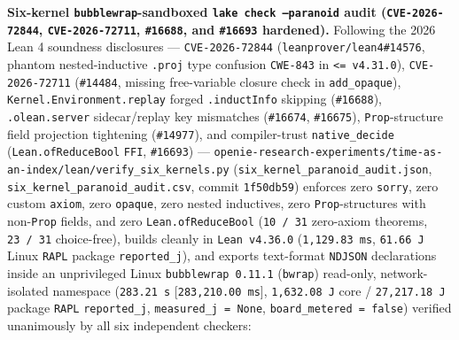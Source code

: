 \documentclass[10pt,letterpaper]{article}
\begin{document}
\textbf{Six-kernel \texttt{bubblewrap}-sandboxed
\texttt{lake\ check\ --paranoid} audit (\texttt{CVE-2026-72844},
\texttt{CVE-2026-72711}, \texttt{\#16688}, and \texttt{\#16693}
hardened).} Following the 2026 Lean 4 soundness disclosures ---
\texttt{CVE-2026-72844} (\texttt{leanprover/\allowbreak{}lean4\#14576}, phantom
nested-inductive \texttt{.proj} type confusion \texttt{CWE-843} in
\texttt{<=\ v4.31.0}), \texttt{CVE-2026-72711} (\texttt{\#14484},
missing free-variable closure check in \texttt{add\_opaque}),
\texttt{Kernel.\allowbreak{}Environment.\allowbreak{}replay} forged \texttt{.inductInfo} skipping
(\texttt{\#16688}), \texttt{.olean.server} sidecar/replay key mismatches
(\texttt{\#16674}, \texttt{\#16675}), \texttt{Prop}-structure field
projection tightening (\texttt{\#14977}), and compiler-trust
\texttt{native\_decide} (\texttt{Lean.\allowbreak{}ofReduceBool} \texttt{FFI},
\texttt{\#16693}) ---
\texttt{openie-\allowbreak{}research-\allowbreak{}experiments/\allowbreak{}time-\allowbreak{}as-\allowbreak{}an-\allowbreak{}index/\allowbreak{}lean/\allowbreak{}verify\_\allowbreak{}six\_\allowbreak{}kernels.\allowbreak{}py}
(\texttt{six\_\allowbreak{}kernel\_\allowbreak{}paranoid\_\allowbreak{}audit.\allowbreak{}json},
\texttt{six\_\allowbreak{}kernel\_\allowbreak{}paranoid\_\allowbreak{}audit.\allowbreak{}csv}, commit
\texttt{1f50db59}) enforces zero \texttt{sorry}, zero custom
\texttt{axiom}, zero \texttt{opaque}, zero nested inductives, zero
\texttt{Prop}-structures with non-\texttt{Prop} fields, and zero
\texttt{Lean.\allowbreak{}ofReduceBool} (\texttt{10\ /\ 31} zero-axiom theorems,
\texttt{23\ /\ 31} choice-free), builds cleanly in
\texttt{Lean\ v4.36.0} (\texttt{1,129.83\ ms}, \texttt{61.66\ J} Linux
\texttt{RAPL} package \texttt{reported\_j}), and exports text-format
\texttt{NDJSON} declarations inside an unprivileged Linux
\texttt{bubblewrap\ 0.11.1} (\texttt{bwrap}) read-only, network-isolated
namespace (\texttt{283.21\ s} [\texttt{283,210.00\ ms}],
\texttt{1,632.08\ J} core / \texttt{27,217.18\ J} package \texttt{RAPL}
\texttt{reported\_j}, \texttt{measured\_j\ =\ None},
\texttt{board\_metered\ =\ false}) verified unanimously by all six
independent checkers:
\end{document}
